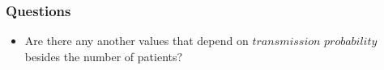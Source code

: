 \documentclass[aspectratio=169, 9pt, xcolor=table]{beamer}
\begin{document}
    

\begin{frame}
    \frametitle{Questions}
    
    \begin{itemize}
        \item Are there any another values that depend on $\textit{transmission probability}$ besides the number of patients?
        
    \end{itemize}
\end{frame}
        

        
\end{document}
